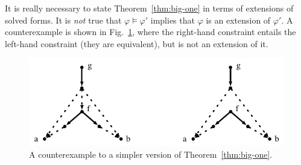 It is really necessary to state
Theorem~\ref{thm:big-one} in terms of extensions of
solved forms.  It is \emph{not} true that $\varphi \models \varphi'$
implies that $\varphi$ is an extension of $\varphi'$.  A
counterexample is shown in Fig.~\ref{fig:counterexample}, where the
right-hand constraint entails the left-hand constraint (they are
equivalent), but is not an extension of it.

\begin{figure}
  \centering
  \includegraphics[scale=0.6]{pic-extension-counterexample}
  \caption{A counterexample to a simpler version of Theorem~\ref{thm:big-one}.}
  \label{fig:counterexample}
\end{figure}



